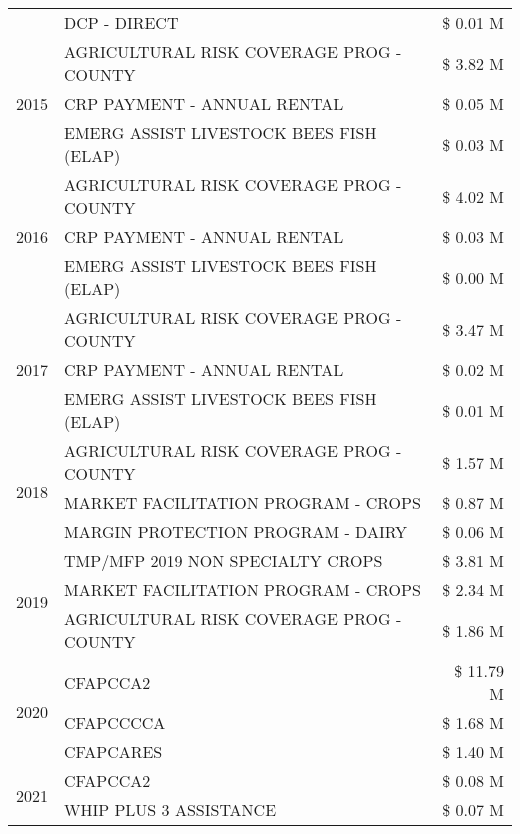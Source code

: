 \begin{tabular}{llr}
 & DCP - DIRECT & \$ 0.01 M \\
\cline{1-3}
\multirow[t]{3}{*}{2015} & AGRICULTURAL RISK COVERAGE PROG - COUNTY & \$ 3.82 M \\
 & CRP PAYMENT - ANNUAL RENTAL & \$ 0.05 M \\
 & EMERG ASSIST LIVESTOCK BEES FISH (ELAP) & \$ 0.03 M \\
\cline{1-3}
\multirow[t]{3}{*}{2016} & AGRICULTURAL RISK COVERAGE PROG - COUNTY & \$ 4.02 M \\
 & CRP PAYMENT - ANNUAL RENTAL & \$ 0.03 M \\
 & EMERG ASSIST LIVESTOCK BEES FISH (ELAP) & \$ 0.00 M \\
\cline{1-3}
\multirow[t]{3}{*}{2017} & AGRICULTURAL RISK COVERAGE PROG - COUNTY & \$ 3.47 M \\
 & CRP PAYMENT - ANNUAL RENTAL & \$ 0.02 M \\
 & EMERG ASSIST LIVESTOCK BEES FISH (ELAP) & \$ 0.01 M \\
\cline{1-3}
\multirow[t]{3}{*}{2018} & AGRICULTURAL RISK COVERAGE PROG - COUNTY & \$ 1.57 M \\
 & MARKET FACILITATION PROGRAM - CROPS & \$ 0.87 M \\
 & MARGIN PROTECTION PROGRAM - DAIRY & \$ 0.06 M \\
\cline{1-3}
\multirow[t]{3}{*}{2019} & TMP/MFP 2019 NON SPECIALTY CROPS & \$ 3.81 M \\
 & MARKET FACILITATION PROGRAM - CROPS & \$ 2.34 M \\
 & AGRICULTURAL RISK COVERAGE PROG - COUNTY & \$ 1.86 M \\
\cline{1-3}
\multirow[t]{3}{*}{2020} & CFAPCCA2 & \$ 11.79 M \\
 & CFAPCCCCA & \$ 1.68 M \\
 & CFAPCARES & \$ 1.40 M \\
\cline{1-3}
\multirow[t]{2}{*}{2021} & CFAPCCA2 & \$ 0.08 M \\
 & WHIP PLUS 3 ASSISTANCE & \$ 0.07 M \\
\cline{1-3}
\bottomrule
\end{tabular}

